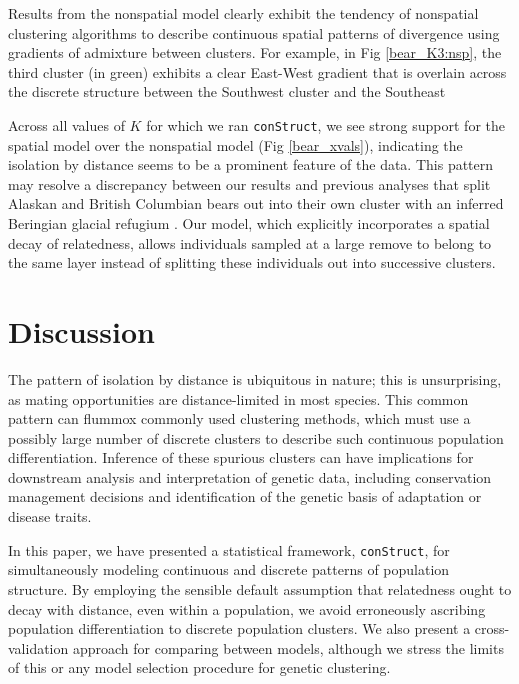 \documentclass[12pt]{article}
\begin{document}
Results from the nonspatial model clearly exhibit the tendency 
of nonspatial clustering algorithms to describe continuous spatial patterns of divergence 
using gradients of admixture between clusters.
For example, in Fig \ref{bear_K3:nsp}, 
the third cluster (in green) exhibits a clear East-West gradient that 
is overlain across the discrete structure between the Southwest cluster and the Southeast 

Across all values of $K$ for which we ran \texttt{conStruct},
we see strong support for the spatial model over the nonspatial model (Fig \ref{bear_xvals}),
indicating the isolation by distance seems to be a prominent feature of the data.
This pattern may resolve a discrepancy between our results and 
previous analyses that split Alaskan and British Columbian bears out 
into their own cluster with an inferred Beringian glacial refugium
\citep{Byun1997,Stone2000,Puckett2015}.
Our model, which explicitly incorporates a spatial decay of relatedness, 
allows individuals sampled at a large remove to belong to the same layer
instead of splitting these individuals out into successive clusters.

\section*{Discussion}

The pattern of isolation by distance is ubiquitous in nature;
this is unsurprising, as mating opportunities are distance-limited in most species.
This common pattern can flummox commonly used clustering methods, 
which must use a possibly large number of discrete clusters
to describe such continuous population differentiation.
Inference of these spurious clusters can have implications for 
downstream analysis and interpretation of genetic data, 
including conservation management decisions and 
identification of the genetic basis of adaptation or disease traits.

In this paper, we have presented a statistical framework, \texttt{conStruct}, for simultaneously 
modeling continuous and discrete patterns of population structure.
By employing the sensible default assumption
that relatedness ought to decay with distance, even within a population, 
we avoid erroneously ascribing population differentiation to discrete population clusters.
We also present a cross-validation approach for comparing between models, 
although we stress the limits of this or any model selection procedure for genetic clustering.
\end{document}
